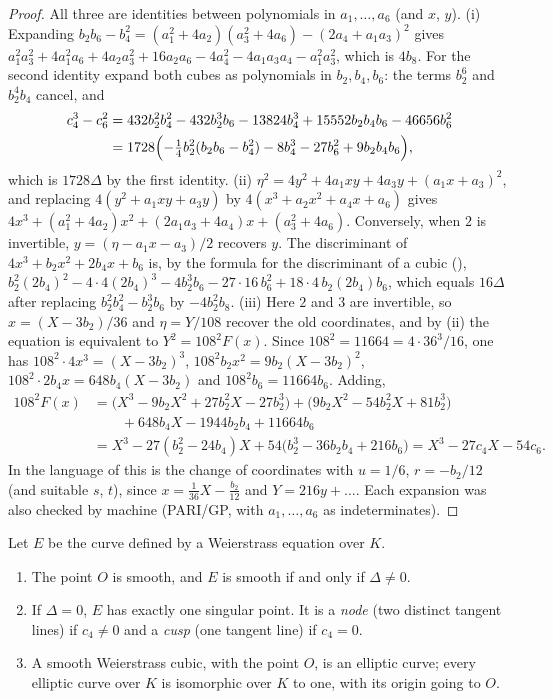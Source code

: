 \begin{proof}
All three are identities between polynomials in $a_1,\dots,a_6$ (and $x$, $y$). (i) Expanding $b_2b_6-b_4^2=(a_1^2+4a_2)(a_3^2+4a_6)-(2a_4+a_1a_3)^2$
gives $a_1^2a_3^2+4a_1^2a_6+4a_2a_3^2+16a_2a_6-4a_4^2-4a_1a_3a_4-a_1^2a_3^2$, which is $4b_8$. For the second identity expand both cubes as polynomials in $b_2,b_4,b_6$: the terms $b_2^6$ and $b_2^4b_4$ cancel, and
\begin{align*}
c_4^3-c_6^2&=432b_2^2b_4^2-432b_2^3b_6-13824b_4^3+15552b_2b_4b_6-46656b_6^2\\
&=1728\Bigl(-\tfrac14b_2^2(b_2b_6-b_4^2)-8b_4^3-27b_6^2+9b_2b_4b_6\Bigr),
\end{align*}
which is $1728\Delta$ by the first identity. (ii) $\eta^2=4y^2+4a_1xy+4a_3y+(a_1x+a_3)^2$, and replacing $4(y^2+a_1xy+a_3y)$ by $4(x^3+a_2x^2+a_4x+a_6)$ gives
$4x^3+(a_1^2+4a_2)x^2+(2a_1a_3+4a_4)x+(a_3^2+4a_6)$. Conversely, when $2$ is invertible, $y=(\eta-a_1x-a_3)/2$ recovers $y$. The
discriminant of $4x^3+b_2x^2+2b_4x+b_6$ is, by the formula for the discriminant of a cubic (),
$b_2^2(2b_4)^2-4\cdot4(2b_4)^3-4b_2^3b_6-27\cdot16\,b_6^2+18\cdot4\,b_2(2b_4)b_6$, which equals $16\Delta$ after replacing $b_2^2b_4^2-b_2^3b_6$
by $-4b_2^2b_8$. (iii) Here $2$ and $3$ are invertible, so $x=(X-3b_2)/36$ and $\eta=Y/108$ recover the old coordinates, and by (ii) the
equation is equivalent to $Y^2=108^2F(x)$. Since $108^2=11664=4\cdot36^3/16$, one has $108^2\cdot4x^3=(X-3b_2)^3$, $108^2b_2x^2=9b_2(X-3b_2)^2$,
$108^2\cdot2b_4x=648b_4(X-3b_2)$ and $108^2b_6=11664b_6$. Adding,
\begin{align*}
108^2F(x)&=\bigl(X^3-9b_2X^2+27b_2^2X-27b_2^3\bigr)+\bigl(9b_2X^2-54b_2^2X+81b_2^3\bigr)\\
&\qquad+648b_4X-1944b_2b_4+11664b_6\\
&=X^3-27(b_2^2-24b_4)X+54\bigl(b_2^3-36b_2b_4+216b_6\bigr)=X^3-27c_4X-54c_6 .
\end{align*}
In the language of  this is the change of coordinates with $u=1/6$, $r=-b_2/12$ (and suitable $s$, $t$), since
$x=\frac1{36}X-\frac{b_2}{12}$ and $Y=216y+\dots$. Each expansion was also checked by machine (PARI/GP, with $a_1,\dots,a_6$ as indeterminates).
\end{proof}

\begin{proposition}[smoothness]\label{prop:ellcurves:smooth}
Let $E$ be the curve defined by a Weierstrass equation over $K$.
\begin{enumerate}[label=(\roman*)]
\item The point $O$ is smooth, and $E$ is smooth if and only if $\Delta\ne0$.
\item If $\Delta=0$, $E$ has exactly one singular point. It is a \emph{node} (two distinct tangent lines) if $c_4\ne0$ and a \emph{cusp} (one
tangent line) if $c_4=0$.
\item A smooth Weierstrass cubic, with the point $O$, is an elliptic curve; every elliptic curve over $K$ is isomorphic over $K$ to one, with its
origin going to $O$.
\end{enumerate}
\end{proposition}

